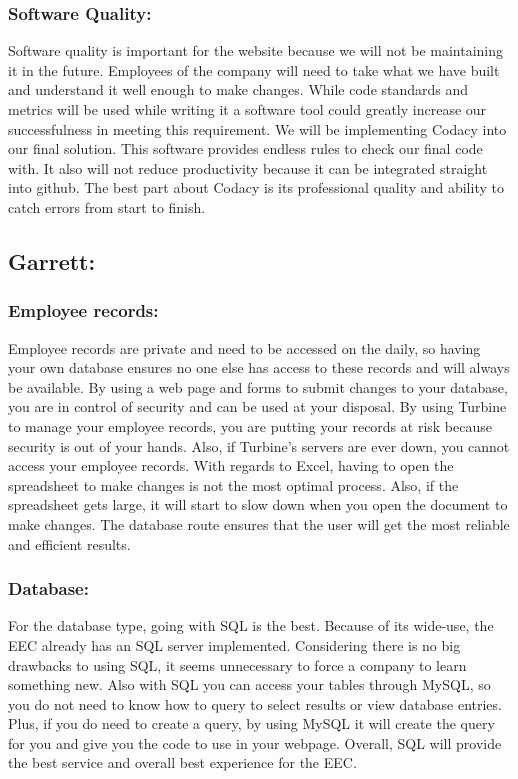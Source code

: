 \documentclass[letterpaper,10pt,titlepage,journal,compsoc,draftclsnofoot,onecolumn]{IEEEtran}
\newcommand\tab[1][1cm]{\hspace*{#1}}
\begin{document}
\subsubsection{Software Quality:}
\tab Software quality is important for the website because we will not be maintaining it in the future. Employees of the company will need to take what we have built and understand it well enough to make changes. While code standards and metrics will be used while writing it a software tool could greatly increase our successfulness in meeting this requirement. We will be implementing Codacy into our final solution. This software provides endless rules to check our final code with. It also will not reduce productivity because it can be integrated straight into github. The best part about Codacy is its professional quality and ability to catch errors from start to finish. \newline

\subsection{Garrett:}
\subsubsection{Employee records:}
\tab Employee records are private and need to be accessed on the daily, so having your own database ensures no one else has access to these records and will always be available. By using a web page and forms to submit changes to your database, you are in control of security and can be used at your disposal. By using Turbine to manage your employee records, you are putting your records at risk because security is out of your hands. Also, if Turbine’s servers are ever down, you cannot access your employee records. With regards to Excel, having to open the spreadsheet to make changes is not the most optimal process. Also, if the spreadsheet gets large, it will start to slow down when you open the document to make changes. The database route ensures that the user will get the most reliable and efficient results.  \newline 

\subsubsection{Database:}
\tab For the database type, going with SQL is the best. Because of its wide-use, the EEC already has an SQL server implemented. Considering there is no big drawbacks to using SQL, it seems unnecessary to force a company to learn something new. Also with SQL you can access your tables through MySQL, so you do not need to know how to query to select results or view database entries. Plus, if you do need to create a query, by using MySQL it will create the query for you and give you the code to use in your webpage. Overall, SQL will provide the best service and overall best experience for the EEC. \newline
\end{document}
